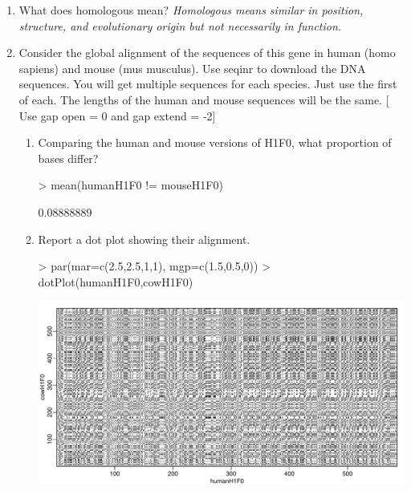 \documentclass[12pt,a4paper]{paper}
\begin{document}
\begin{enumerate}
\begin{Schunk}
\end{Schunk}
\begin{enumerate}
\item What does homologous mean?
\textit{Homologous means similar in position, structure, and evolutionary origin but not necessarily in function.}
\item Consider the global alignment of the sequences of this gene in human (homo sapiens) and mouse (mus musculus). Use seqinr to download the DNA sequences. You will get multiple sequences for each species. Just use the first of each. The lengths of the human and mouse sequences will be the same. [ Use gap open = 0 and gap extend = -2]
\begin{enumerate}
\item Comparing the human and mouse versions of H1F0, what proportion of bases differ?
\begin{Schunk}
\begin{Sinput}
> mean(humanH1F0 != mouseH1F0)
\end{Sinput}
\begin{Soutput}
[1] 0.08888889
\end{Soutput}
\end{Schunk}
\item Report a dot plot showing their alignment.
\begin{Schunk}
\begin{Sinput}
> par(mar=c(2.5,2.5,1,1), mgp=c(1.5,0.5,0))
> dotPlot(humanH1F0,cowH1F0)
\end{Sinput}
\end{Schunk}
\includegraphics{Osorio_Daniel_HW4-010}

\end{enumerate}
\end{enumerate}
\end{enumerate}
\end{document}

